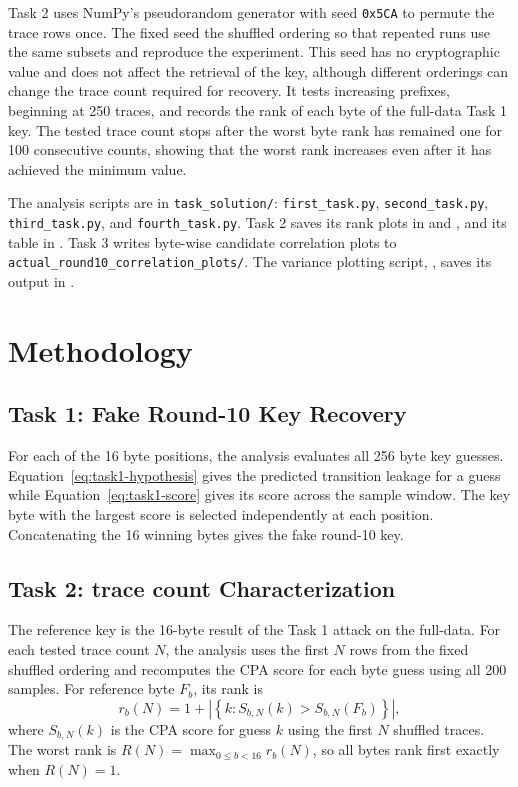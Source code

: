 \documentclass[conference,10pt,letterpaper]{IEEEtran}
\begin{document}
Task 2 uses NumPy's pseudorandom generator with seed \texttt{0x5CA} to permute the trace rows once. The fixed seed the shuffled ordering so that repeated runs use the same subsets and reproduce the experiment. This seed has no cryptographic value and does not affect the retrieval of the key, although different orderings can change the trace count required for recovery. It tests increasing prefixes, beginning at 250 traces, and records the rank of each byte of the full-data Task 1 key. The tested trace count stops after the worst byte rank has remained one for 100 consecutive counts, showing that the worst rank increases even after it has achieved the minimum value.

The analysis scripts are in \texttt{task\_solution/}: \texttt{first\_task.py}, \texttt{second\_task.py}, \texttt{third\_task.py}, and \texttt{fourth\_task.py}. Task 2 saves its rank plots in  and , and its table in . Task 3 writes byte-wise candidate correlation plots to \texttt{actual\_round10\_correlation\_plots/}. The variance plotting script, , saves its output in .

\section{Methodology}
\subsection{Task 1: Fake Round-10 Key Recovery}
For each of the 16 byte positions, the analysis evaluates all 256 byte key guesses. Equation~\eqref{eq:task1-hypothesis} gives the predicted transition leakage for a guess while Equation~\eqref{eq:task1-score} gives its score across the sample window. The key byte with the largest score is selected independently at each position. Concatenating the 16 winning bytes gives the fake round-10 key.

\subsection{Task 2: trace count Characterization}
The reference key is the 16-byte result of the Task 1 attack on the full-data. For each tested trace count $N$, the analysis uses the first $N$ rows from the fixed shuffled ordering and recomputes the CPA score for each byte guess using all 200 samples. For reference byte $F_b$, its rank is
\begin{equation}
r_b(N)=1+\left|\left\{k:S_{b,N}(k)>S_{b,N}(F_b)\right\}\right|,
\label{eq:rank}
\end{equation}
where $S_{b,N}(k)$ is the CPA score for guess $k$ using the first $N$ shuffled traces. The worst rank is $R(N)=\max_{0\leq b<16}r_b(N)$, so all bytes rank first exactly when $R(N)=1$.
\end{document}
